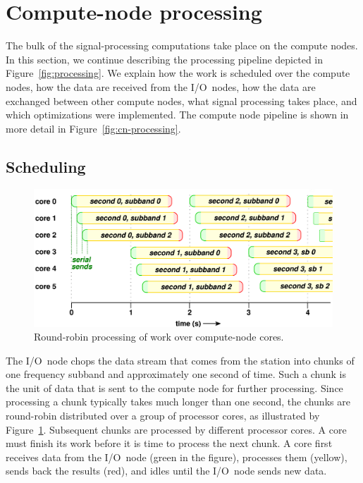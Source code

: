 \documentclass{sig-alternate}
\begin{document}
\section{Compute-node processing}
\label{sec:CNProc}

The bulk of the signal-processing computations take place on the compute nodes.
In this section, we continue describing the processing pipeline depicted in
Figure~\ref{fig:processing}. 
We explain how the work is scheduled over the compute nodes, how the data are
received from the I/O~nodes, how the data are exchanged between other compute
nodes, what signal processing takes place, and which optimizations were
implemented.
The compute node pipeline is shown in more detail in
Figure~\ref{fig:cn-processing}.


\subsection{Scheduling}

\begin{figure}[ht]
\includegraphics[width=\columnwidth]{round-robin.pdf}
\caption{Round-robin processing of work over compute-node cores.}
\label{fig:round-robin}
\end{figure}

The I/O~node chops the data stream that comes from the station into chunks of
one frequency subband and approximately one second of time.
Such a chunk is the unit of data that is sent to the compute node for further
processing.
Since processing a chunk typically takes much longer than one second,
the chunks are round-robin distributed over a group of processor cores,
as illustrated by Figure~\ref{fig:round-robin}.
Subsequent chunks are processed by different processor cores.
A core must finish its work before it is time to process the next chunk.
A core first receives data from the I/O~node (green in the figure),
processes them (yellow), sends back the results (red), and idles until the
I/O~node sends new data.
\end{document}
